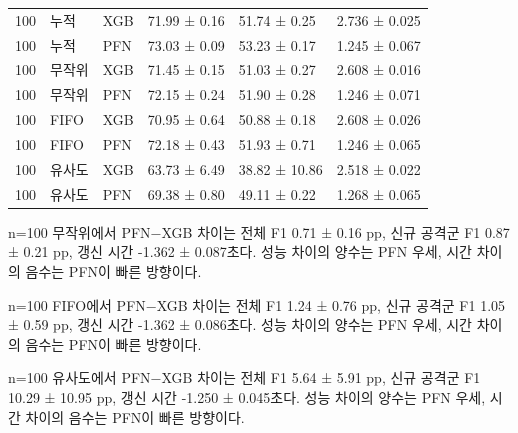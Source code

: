 \begin{longtable}
{}100 & 누적 & XGB & 71.99 ± 0.16 & 51.74 ± 0.25 & 2.736 ± 0.025 \\
{}100 & 누적 & PFN & 73.03 ± 0.09 & 53.23 ± 0.17 & 1.245 ± 0.067 \\
{}100 & 무작위 & XGB & 71.45 ± 0.15 & 51.03 ± 0.27 & 2.608 ± 0.016 \\
{}100 & 무작위 & PFN & 72.15 ± 0.24 & 51.90 ± 0.28 & 1.246 ± 0.071 \\
{}100 & FIFO & XGB & 70.95 ± 0.64 & 50.88 ± 0.18 & 2.608 ± 0.026 \\
{}100 & FIFO & PFN & 72.18 ± 0.43 & 51.93 ± 0.71 & 1.246 ± 0.065 \\
{}100 & 유사도 & XGB & 63.73 ± 6.49 & 38.82 ± 10.86 & 2.518 ± 0.022 \\
{}100 & 유사도 & PFN & 69.38 ± 0.80 & 49.11 ± 0.22 & 1.268 ± 0.065 \\
\bottomrule
\end{longtable}
\endgroup
n=\allowbreak{}100 무작위에서 PFN−XGB 차이는 전체 F1 0.71 ± 0.16 pp, 신규 공격군 F1 0.87 ± 0.21 pp, 갱신 시간 -1.362 ± 0.087초다. 성능 차이의 양수는 PFN 우세, 시간 차이의 음수는 PFN이 빠른 방향이다.

n=\allowbreak{}100 FIFO에서 PFN−XGB 차이는 전체 F1 1.24 ± 0.76 pp, 신규 공격군 F1 1.05 ± 0.59 pp, 갱신 시간 -1.362 ± 0.086초다. 성능 차이의 양수는 PFN 우세, 시간 차이의 음수는 PFN이 빠른 방향이다.

n=\allowbreak{}100 유사도에서 PFN−XGB 차이는 전체 F1 5.64 ± 5.91 pp, 신규 공격군 F1 10.29 ± 10.95 pp, 갱신 시간 -1.250 ± 0.045초다. 성능 차이의 양수는 PFN 우세, 시간 차이의 음수는 PFN이 빠른 방향이다.

